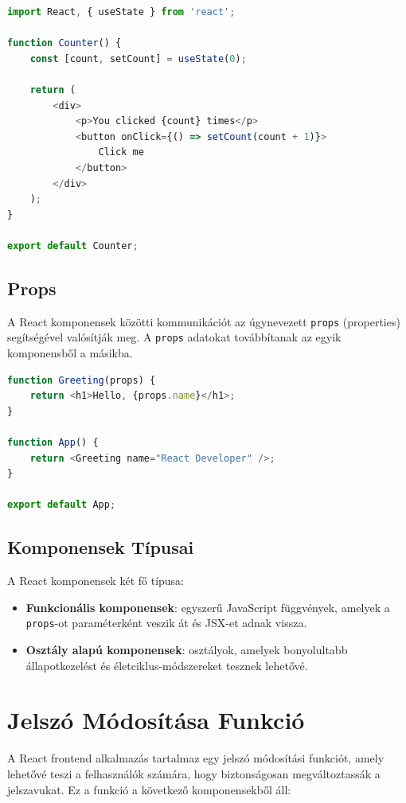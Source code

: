 \documentclass[colorlinks]{thesis-kando}
\theoremstyle{definition}
\theoremstyle{remark}
\begin{document}
\begin{lstlisting}[language=JavaScript]
import React, { useState } from 'react';

function Counter() {
    const [count, setCount] = useState(0);

    return (
        <div>
            <p>You clicked {count} times</p>
            <button onClick={() => setCount(count + 1)}>
                Click me
            </button>
        </div>
    );
}

export default Counter;
\end{lstlisting}

\subsection{Props}
A React komponensek közötti kommunikációt az úgynevezett \texttt{props} (properties) segítségével valósítják meg. A \texttt{props} adatokat továbbítanak az egyik komponensből a másikba.

\begin{lstlisting}[language = JavaScript]
function Greeting(props) {
    return <h1>Hello, {props.name}</h1>;
}

function App() {
    return <Greeting name="React Developer" />;
}

export default App;
\end{lstlisting}

\subsection{Komponensek Típusai}
A React komponensek két fő típusa:
\begin{itemize}
    \item \textbf{Funkcionális komponensek}: egyszerű JavaScript függvények, amelyek a \texttt{props}-ot paraméterként veszik át és JSX-et adnak vissza.
    \item \textbf{Osztály alapú komponensek}: osztályok, amelyek bonyolultabb állapotkezelést és életciklus-módszereket tesznek lehetővé.
\end{itemize}

\pagebreak


\section{Jelszó Módosítása Funkció}
A React frontend alkalmazás tartalmaz egy jelszó módosítási funkciót, amely lehetővé teszi a felhasználók számára, hogy biztonságosan megváltoztassák a jelszavukat. Ez a funkció a következő komponensekből áll:
\end{document}
